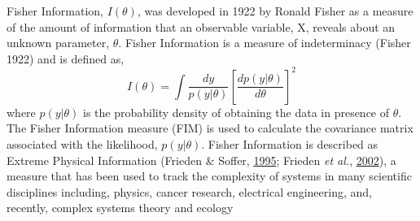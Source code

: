 \documentclass[print]{nuthesis}
\begin{document}
Fisher Information, \(I(\theta)\), was developed in 1922 by Ronald Fisher as a measure of the amount of information that an observable variable, X, reveals about an unknown parameter, \(\theta\). Fisher Information is a measure of indeterminacy (Fisher 1922) and is defined as,
\begin{equation} 
  I(\theta) = \int \frac{dy}{p(y|\theta)}\left[\frac{dp(y|\theta)}{d\theta}\right]^2
  \label{eq:fiGeneral1922}
\end{equation}
where \(p(y|\theta)\) is the probability density of obtaining the data in presence of \(\theta\). The Fisher Information measure (FIM) is used to calculate the covariance matrix associated with the likelihood, \(p(y|\theta)\). Fisher Information is described as Extreme Physical Information (Frieden \& Soffer, \protect\hyperlink{ref-frieden1995lagrangians}{1995}; Frieden \emph{et al.}, \protect\hyperlink{ref-frieden_non-equilibrium_2002}{2002}), a measure that has been used to track the complexity of systems in many scientific disciplines including, physics, cancer research, electrical engineering, and, recently, complex systems theory and ecology
\end{document}
